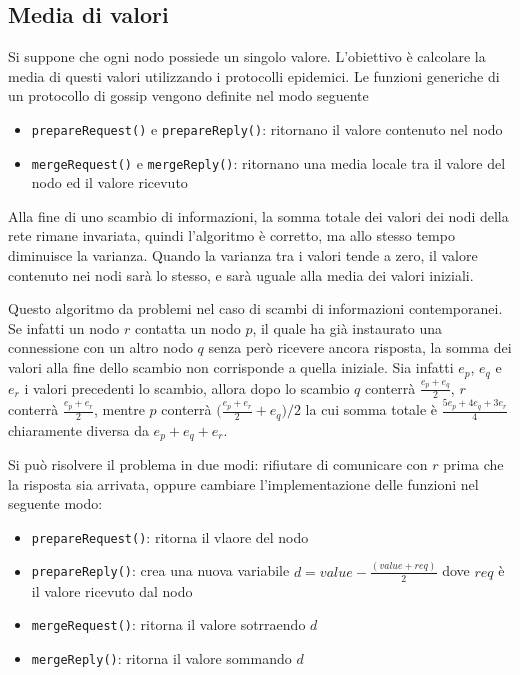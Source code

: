 \subsection{Media di valori}
Si suppone che ogni nodo possiede un singolo valore. L'obiettivo è calcolare la media di questi valori utilizzando i protocolli epidemici. Le funzioni generiche di un protocollo di gossip vengono definite nel modo seguente
\begin{itemize}
    \item \texttt{prepareRequest()} e \texttt{prepareReply()}: ritornano il valore contenuto nel nodo
    \item \texttt{mergeRequest()} e \texttt{mergeReply()}: ritornano una media locale tra il valore del nodo ed il valore ricevuto
\end{itemize}
Alla fine di uno scambio di informazioni, la somma totale dei valori dei nodi della rete rimane invariata, quindi l'algoritmo è corretto, ma allo stesso tempo diminuisce la varianza. Quando la varianza tra i valori tende a zero, il valore contenuto nei nodi sarà lo stesso, e sarà uguale alla media dei valori iniziali.

Questo algoritmo da problemi nel caso di scambi di informazioni contemporanei. Se infatti un nodo $r$ contatta un nodo $p$, il quale ha già instaurato una connessione con un altro nodo $q$ senza però ricevere ancora risposta, la somma dei valori alla fine dello scambio non corrisponde a quella iniziale. Sia infatti $e_p$, $e_q$ e $e_r$ i valori precedenti lo scambio, allora dopo lo scambio $q$ conterrà $\frac{e_p+e_q}{2}$, $r$ conterrà $\frac{e_p + e_r}{2}$, mentre $p$ conterrà $\Big(\frac{e_p+e_r}{2} + e_q\Big) / 2$ la cui somma totale è $\frac{5e_p + 4 e_q + 3e_r}{4}$ chiaramente diversa da $e_p+e_q+e_r$.

Si può risolvere il problema in due modi: rifiutare di comunicare con $r$ prima che la risposta sia arrivata, oppure cambiare l'implementazione delle funzioni nel seguente modo:
\begin{itemize}
    \item \texttt{prepareRequest()}: ritorna il vlaore del nodo
    \item \texttt{prepareReply()}: crea una nuova variabile $d=value - \frac{(value + req)}{2}$ dove $req$ è il valore ricevuto dal nodo
    \item \texttt{mergeRequest()}: ritorna il valore sotrraendo $d$
    \item \texttt{mergeReply()}: ritorna il valore sommando $d$
\end{itemize}


